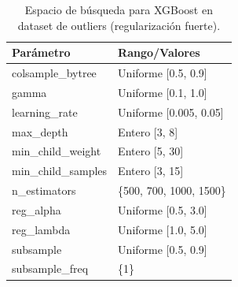 \documentclass[conference]{IEEEtran}
\begin{document}
    \begin{table}[H]
        \centering
        \caption{Espacio de búsqueda para XGBoost en dataset de outliers (regularización fuerte).}
        \label{tab:search_xgb_outliers}
        \small
        \begin{tabular}{ll}
            \toprule
            \textbf{Parámetro} & \textbf{Rango/Valores} \\
            \midrule
            colsample\_bytree  & Uniforme [0.5, 0.9] \\
            gamma              & Uniforme [0.1, 1.0] \\
            learning\_rate     & Uniforme [0.005, 0.05] \\
            max\_depth         & Entero [3, 8] \\
            min\_child\_weight  & Entero [5, 30] \\
            min\_child\_samples & Entero [3, 15] \\
            n\_estimators      & \{500, 700, 1000, 1500\} \\
            reg\_alpha         & Uniforme [0.5, 3.0] \\
            reg\_lambda        & Uniforme [1.0, 5.0] \\
            subsample          & Uniforme [0.5, 0.9] \\
            subsample\_freq    & \{1\} \\
            \bottomrule
        \end{tabular}
    \end{table}

    
\end{document}
